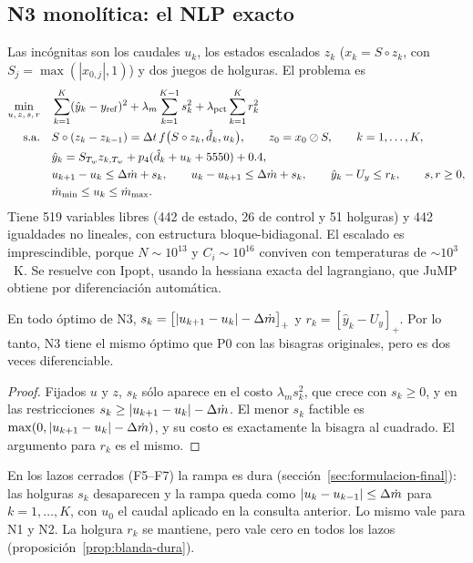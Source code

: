 \subsection{N3 monolítica: el NLP exacto}
Las incógnitas son los caudales $u_k$, los estados escalados $z_k$ ($x_k=S\circ z_k$, con
$S_j=\max(|x_{0,j}|,1)$) y dos juegos de holguras. El problema es
\begin{align*}
\min_{u,\,z,\,s,\,r}\quad & \sum_{k=1}^{K}(\hat y_k-y_{\rm ref})^2+\lambda_m\sum_{k=1}^{K-1}s_k^2+\lambda_{\rm pct}\sum_{k=1}^{K}r_k^2\\
\text{s.a.}\quad & S\circ(z_k-z_{k-1})=\Delta t\,f\big(S\circ z_k,\hat d_k,u_k\big),\qquad z_0=x_0\oslash S,\qquad k=1,\dots,K,\\
& \hat y_k=S_{T_w}z_{k,T_w}+p_4(\hat d_k+u_k+5550)+0.4,\\
& u_{k+1}-u_k\le\Delta\dot m+s_k,\qquad u_k-u_{k+1}\le\Delta\dot m+s_k,\qquad \hat y_k-U_y\le r_k,\qquad s,r\ge0,\\
& \dot m_{\rm min}\le u_k\le\dot m_{\rm max}.
\end{align*}
Tiene 519 variables libres (442 de estado, 26 de control y 51 holguras) y 442 igualdades no
lineales, con estructura bloque-bidiagonal. El escalado es imprescindible, porque
$N\sim10^{13}$ y $C_i\sim10^{16}$ conviven con temperaturas de $\sim10^3$~K. Se resuelve con
Ipopt, usando la hessiana exacta del lagrangiano, que JuMP obtiene por diferenciación
automática.

\begin{proposicion}\label{prop:holguras}
En todo óptimo de N3, $s_k=\big[|u_{k+1}-u_k|-\Delta\dot m\big]_+$ y $r_k=[\hat y_k-U_y]_+$. Por lo
tanto, N3 tiene el mismo óptimo que P0 con las bisagras originales, pero es dos veces
diferenciable.
\end{proposicion}
\begin{proof}
Fijados $u$ y $z$, $s_k$ sólo aparece en el costo $\lambda_ms_k^2$, que crece con $s_k\ge0$, y
en las restricciones $s_k\ge|u_{k+1}-u_k|-\Delta\dot m$. El menor $s_k$ factible es
$\max(0,|u_{k+1}-u_k|-\Delta\dot m)$, y su costo es exactamente la bisagra al cuadrado. El
argumento para $r_k$ es el mismo.
\end{proof}
\noindent En los lazos cerrados (F5--F7) la rampa es dura (sección~\ref{sec:formulacion-final}):
las holguras $s_k$ desaparecen y la rampa queda como $|u_k-u_{k-1}|\le\Delta\dot m$ para
$k=1,\dots,K$, con $u_0$ el caudal aplicado en la consulta anterior. Lo mismo vale para N1 y
N2. La holgura $r_k$ se mantiene, pero vale cero en todos los lazos
(proposición~\ref{prop:blanda-dura}).

